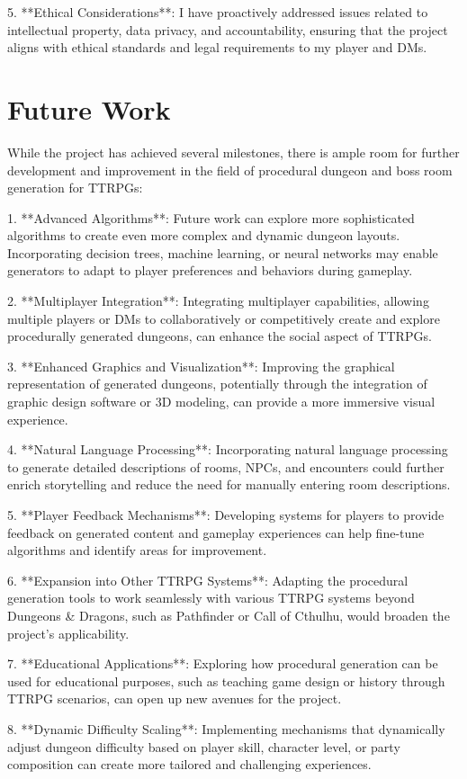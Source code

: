 \documentclass[10pt,twocolumn]{article}
\begin{document}
5. **Ethical Considerations**: I have proactively addressed issues related to intellectual property, data privacy, and accountability, ensuring that the project aligns with ethical standards and legal requirements to my player and DMs.
\section{Future Work}
While the project has achieved several milestones, there is ample room for further development and improvement in the field of procedural dungeon and boss room generation for TTRPGs:

1. **Advanced Algorithms**: Future work can explore more sophisticated algorithms to create even more complex and dynamic dungeon layouts. Incorporating decision trees, machine learning, or neural networks may enable generators to adapt to player preferences and behaviors during gameplay.

2. **Multiplayer Integration**: Integrating multiplayer capabilities, allowing multiple players or DMs to collaboratively or competitively create and explore procedurally generated dungeons, can enhance the social aspect of TTRPGs.

3. **Enhanced Graphics and Visualization**: Improving the graphical representation of generated dungeons, potentially through the integration of graphic design software or 3D modeling, can provide a more immersive visual experience.

4. **Natural Language Processing**: Incorporating natural language processing to generate detailed descriptions of rooms, NPCs, and encounters could further enrich storytelling and reduce the need for manually entering room descriptions.

5. **Player Feedback Mechanisms**: Developing systems for players to provide feedback on generated content and gameplay experiences can help fine-tune algorithms and identify areas for improvement.

6. **Expansion into Other TTRPG Systems**: Adapting the procedural generation tools to work seamlessly with various TTRPG systems beyond Dungeons & Dragons, such as Pathfinder or Call of Cthulhu, would broaden the project's applicability.

7. **Educational Applications**: Exploring how procedural generation can be used for educational purposes, such as teaching game design or history through TTRPG scenarios, can open up new avenues for the project.

8. **Dynamic Difficulty Scaling**: Implementing mechanisms that dynamically adjust dungeon difficulty based on player skill, character level, or party composition can create more tailored and challenging experiences.
\end{document}
